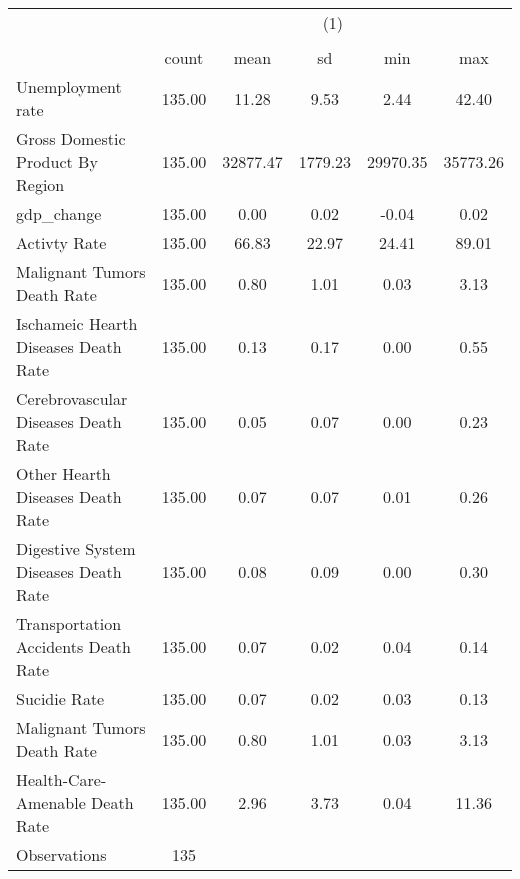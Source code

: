 {
\def\sym#1{\ifmmode^{#1}\else\(^{#1}\)\fi}
\begin{tabular}{l*{1}{ccccc}}
\hline\hline
                    &\multicolumn{5}{c}{(1)}                                                  \\
                    &\multicolumn{5}{c}{}                                                     \\
                    &       count         &        mean&          sd&         min&         max\\
\hline
Unemployment rate   &      135.00         &       11.28&        9.53&        2.44&       42.40\\
Gross Domestic Product By Region&      135.00         &    32877.47&     1779.23&    29970.35&    35773.26\\
gdp\_change          &      135.00         &        0.00&        0.02&       -0.04&        0.02\\
Activty Rate        &      135.00         &       66.83&       22.97&       24.41&       89.01\\
Malignant Tumors Death Rate&      135.00         &        0.80&        1.01&        0.03&        3.13\\
Ischameic Hearth Diseases Death Rate&      135.00         &        0.13&        0.17&        0.00&        0.55\\
Cerebrovascular Diseases Death Rate&      135.00         &        0.05&        0.07&        0.00&        0.23\\
Other Hearth Diseases Death Rate&      135.00         &        0.07&        0.07&        0.01&        0.26\\
Digestive System Diseases Death Rate&      135.00         &        0.08&        0.09&        0.00&        0.30\\
Transportation Accidents Death Rate&      135.00         &        0.07&        0.02&        0.04&        0.14\\
Sucidie Rate        &      135.00         &        0.07&        0.02&        0.03&        0.13\\
Malignant Tumors Death Rate&      135.00         &        0.80&        1.01&        0.03&        3.13\\
Health-Care-Amenable Death Rate&      135.00         &        2.96&        3.73&        0.04&       11.36\\
\hline
Observations        &         135         &            &            &            &            \\
\hline\hline
\end{tabular}
}
